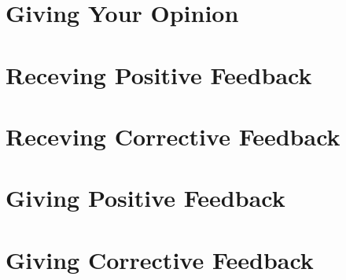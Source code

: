 \documentclass{article}
\begin{document}
\begin{multicols}{2}

	\section{Giving Your Opinion}
    
	\section{Receving Positive Feedback}

	\section{Receving Corrective Feedback}
    
\columnbreak

	\section{Giving Positive Feedback}

	\section{Giving Corrective Feedback}

\end{multicols}
\end{document}
